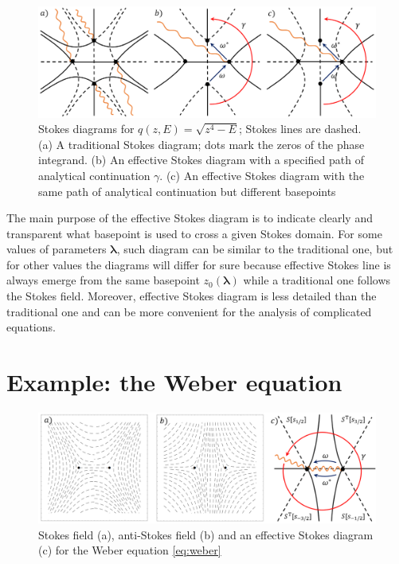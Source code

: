 \documentclass[atmp]{ipart_v1}
\def\lmbd{\bm{\lambda}}
\newcommand\eref[1]{\eqref{#1}}
\begin{document}
\begin{figure}
\centering
\noindent
\includegraphics[width=\textwidth]{effsd_2.png}
\caption{
Stokes diagrams for $q(z,E)=\sqrt{z^4-E}$; Stokes lines are dashed.
(a) A traditional Stokes diagram; dots mark the zeros of the phase integrand.
(b) An effective Stokes diagram with a specified path of analytical continuation $\gamma$.
(c) An effective Stokes diagram with the same path of analytical continuation but different basepoints}
\label{fig:effsd_2}
\end{figure} 

The main purpose of the effective Stokes diagram is to indicate clearly and transparent what
basepoint is used to cross a given Stokes domain. For some values of parameters $\lmbd$, such
diagram can be similar to the traditional one, but for other values the diagrams will differ
for sure because effective Stokes line is always emerge from the same basepoint $z_0(\lmbd)$
while a traditional one follows the Stokes field. Moreover, effective Stokes diagram
is less detailed than the traditional one and can be more convenient for the analysis of 
complicated equations.














\section{Example: the Weber equation \label{sec:weber}}

\begin{figure}
\centering
\noindent
\includegraphics[width=\textwidth]{wsd.png}
\caption{Stokes field (a), anti-Stokes field (b) and an effective Stokes diagram (c) 
for the Weber equation \eref{eq:weber}}
\label{fig:wsd}
\end{figure} 
\end{document}
